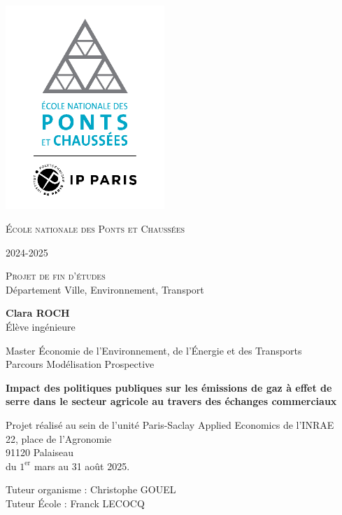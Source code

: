 \begin{titlepage}
    \vspace*{-2.5cm}
    \begin{center}
        \includegraphics[width=6cm]{logo_ponts.png}\par
        {\LARGE \textsc{École nationale des Ponts et Chaussées}\par}

        2024-2025

        \vspace{0.5cm}
        {\Large \textsc{Projet de fin d’études}} \\
        Département Ville, Environnement, Transport

        \vspace{0.5cm}
        {\large \textbf{Clara ROCH}} \\
        Élève ingénieure

        Master Économie de l’Environnement, de l’Énergie et des Transports \\
        Parcours Modélisation Prospective

        \vspace{0.5cm}
        {\LARGE \bfseries {Impact des politiques publiques sur les émissions de gaz à effet de serre dans le secteur agricole au travers des échanges commerciaux} \par}

        \vspace{1cm}
        Projet réalisé au sein de l'unité Paris-Saclay Applied Economics de l'INRAE \\
        22, place de l'Agronomie \\
        91120 Palaiseau \\
        du $1^{\text{er}}$ mars au 31 août 2025.

        \vspace{1cm}
        {\large Tuteur organisme : Christophe GOUEL \\
        Tuteur École : Franck LECOCQ}

    \end{center}
\end{titlepage}
